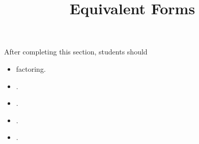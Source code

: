 \documentclass{ximera}
\title{Equivalent Forms}
\begin{document}
\begin{abstract}
\end{abstract}
\maketitle

\begin{sectionOutcomes}
After completing this section, students should 

\begin{itemize}
\item factoring.
\item .
\item .
\item .
\item .
\end{itemize}
\end{sectionOutcomes}
\end{document}
